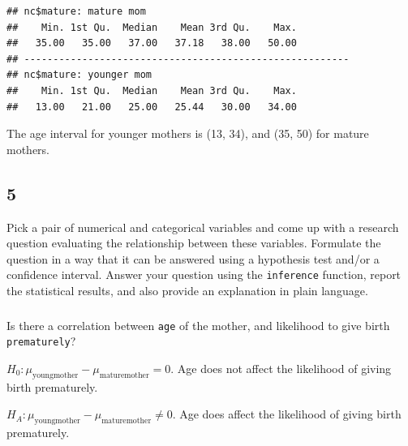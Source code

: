\documentclass[]{article}
\newenvironment{Shaded}{\begin{snugshade}}{\end{snugshade}}
\newcommand{\KeywordTok}[1]{\textcolor[rgb]{0.13,0.29,0.53}{\textbf{#1}}}
\newcommand{\DataTypeTok}[1]{\textcolor[rgb]{0.13,0.29,0.53}{#1}}
\newcommand{\DecValTok}[1]{\textcolor[rgb]{0.00,0.00,0.81}{#1}}
\newcommand{\StringTok}[1]{\textcolor[rgb]{0.31,0.60,0.02}{#1}}
\newcommand{\OperatorTok}[1]{\textcolor[rgb]{0.81,0.36,0.00}{\textbf{#1}}}
\newcommand{\NormalTok}[1]{#1}
\begin{document}
\begin{verbatim}
## nc$mature: mature mom
##    Min. 1st Qu.  Median    Mean 3rd Qu.    Max. 
##   35.00   35.00   37.00   37.18   38.00   50.00 
## -------------------------------------------------------- 
## nc$mature: younger mom
##    Min. 1st Qu.  Median    Mean 3rd Qu.    Max. 
##   13.00   21.00   25.00   25.44   30.00   34.00
\end{verbatim}

The age interval for younger mothers is (13, 34), and (35, 50) for
mature mothers.

\subsection{5}\label{section-4}

Pick a pair of numerical and categorical variables and come up with a
research question evaluating the relationship between these variables.
Formulate the question in a way that it can be answered using a
hypothesis test and/or a confidence interval. Answer your question using
the \texttt{inference} function, report the statistical results, and
also provide an explanation in plain language.

\subsubsection{}\label{section-5}

Is there a correlation between \texttt{age} of the mother, and
likelihood to give birth \texttt{prematurely}?

\(H_0: \mu_{\text{youngmother}} - \mu_{\text{maturemother}} = 0\). Age
does not affect the likelihood of giving birth prematurely.

\(H_A: \mu_{\text{youngmother}} - \mu_{\text{maturemother}} \neq 0\).
Age does affect the likelihood of giving birth prematurely.

\begin{Shaded}
\end{Shaded}
\end{document}
